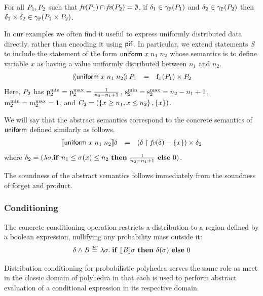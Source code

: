 \begin{lemma}
\label{lem:pp:product}
For all $P_{1}, P_{2}$ such that $\textit{fv}(P_{1}) \cap
\textit{fv}(P_{2}) = \emptyset$, if $\delta_1 \in \gamma_{\mathbb{P}}(P_{1})$ and
$\delta_2 \in \gamma_{\mathbb{P}}(P_{2})$ then $\delta_1 \times \delta_2
\in \gamma_{\mathbb{P}}(P_{1} \times P_{2})$. 
\end{lemma}

In our examples we often find it useful to express uniformly distributed
data directly, rather than encoding it using $\mathsf{pif}$.  In particular,
we extend statements $S$ to include the statement of the form
$\mathsf{uniform}\;{x}\;{n_1}\;n_2$ whose semantics is to define variable $x$ as
having a value uniformly distributed between $n_1$ and $n_2$.
$$
\begin{array}{rcl}
\langle\!\langle{\mathsf{uniform}\;{x}\;{n_1}\;n_2}\rangle\!\rangle\,{P_{1}} & = & \mathrm{f}_{x}(P_{1})
\times P_{2}
\end{array}
$$
Here, $ P_{2} $ has $ \mathrm{p}^\mathrm{min}_{2} = \mathrm{p}^\mathrm{max}_{2} = \frac{1}{n_2 - n_1 + 1}
$, $ \mathrm{s}^\mathrm{min}_{2} = \mathrm{s}^\mathrm{max}_{2} = n_2 - n_1 + 1 $, $ \mathrm{m}^\mathrm{min}_{2} = \mathrm{m}^\mathrm{max}_{2} = 1
$, and $ C_2 = (\left\{ x \geq n_1, x \leq n_2 \right\}, \left\{ x \right\}) $.

We will say that the abstract semantics correspond to the concrete
semantics of $ \mathsf{uniform} $ defined similarly as follows.
$$
\begin{array}{rcl}
[\![{\mathsf{uniform}\;{x}\;{n_1}\;n_2}]\!]{\delta} & = &
\left( \delta \upharpoonright \textit{fv}(\delta) - \left\{ x \right\} \right) \times \delta_2
\end{array}
$$
where $ \delta_2 = (\lambda \sigma. \text{\textbf{if} } n_1 \leq \sigma(x)
\leq n_2 \text{ \textbf{then} } \frac{1}{n_2 - n_1 + 1} \text{ \textbf{else} } 0)$.

The soundness of the abstract semantics follows immediately from the
soundness of forget and product.

\subsubsection{Conditioning}

\newcommand{\nn}{\overline{n}} 
\newcommand{\nnu}{\underline{n}} 

The concrete conditioning operation restricts a distribution to a
region defined by a boolean expression, nullifying any probability mass outside it:
$$ \delta \wedge \mathit{B} \stackrel{\smash{\scriptscriptstyle \mathrm{def}}}= \lambda \sigma . \; \text{\textbf{if} } [\![{\mathit{B}}]\!]{\sigma} \text{ \textbf{then} }
\delta(\sigma) \text{ \textbf{else} } 0 $$

Distribution conditioning for probabilistic polyhedra serves the same
role as meet in the classic domain of polyhedra in that each is used
to perform abstract evaluation of a conditional expression in its
respective domain.

